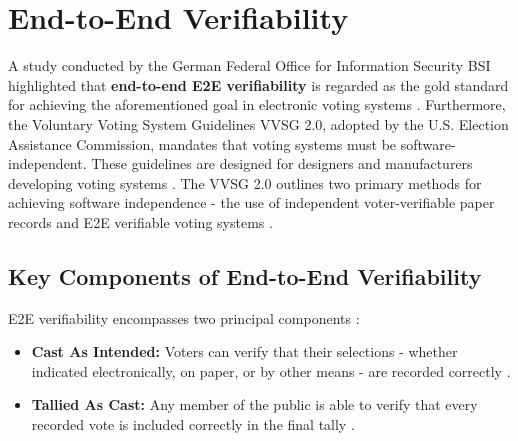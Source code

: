 \section{End-to-End Verifiability}
A study conducted by the German Federal Office for Information Security \ac{BSI} highlighted that \textbf{end-to-end \ac{E2E} verifiability} is regarded as the gold standard for achieving the aforementioned goal in electronic voting systems \cite[10]{stuve-study}. Furthermore, the Voluntary Voting System Guidelines \ac{VVSG} 2.0, adopted by the U.S. Election Assistance Commission, mandates that voting systems must be software-independent. These guidelines are designed for designers and manufacturers developing voting systems \cite{vvsg-intro}. The \ac{VVSG} 2.0 outlines two primary methods for achieving software independence - the use of independent voter-verifiable paper records and \ac{E2E} verifiable voting systems \cite[181]{vvsg}. 

\subsection{Key Components of End-to-End Verifiability}

\ac{E2E} verifiability encompasses two principal components \cite[2]{e2e-primer}:
\begin{itemize}
    \item \textbf{Cast As Intended:} Voters can verify that their selections - whether indicated electronically, on paper, or by other means - are recorded correctly \cite[2]{e2e-primer}.
    \item \textbf{Tallied As Cast:} Any member of the public is able to verify that every recorded vote is included correctly in the final tally \cite[2]{e2e-primer}.
\end{itemize}

